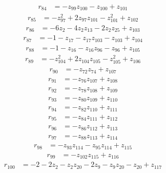 \begin{align*}
r_{84} &= -z_{99}z_{100} - z_{100} + z_{101}
\end{align*}
\begin{align*}
r_{85} &= -z_{97}^{2} + 2z_{97}z_{101} - z_{101}^{2} + z_{102}
\end{align*}
\begin{align*}
r_{86} &= -6z_{2} - 4z_{2}z_{13} - 2z_{2}z_{25} + z_{103}
\end{align*}
\begin{align*}
r_{87} &= -1 - z_{17} - z_{17}z_{103} - z_{103} + z_{104}
\end{align*}
\begin{align*}
r_{88} &= -1 - z_{16} - z_{16}z_{96} - z_{96} + z_{105}
\end{align*}
\begin{align*}
r_{89} &= -z_{104}^{2} + 2z_{104}z_{105} - z_{105}^{2} + z_{106}
\end{align*}
\begin{align*}
r_{90} &= -z_{72}z_{74} + z_{107}
\end{align*}
\begin{align*}
r_{91} &= -z_{76}z_{107} + z_{108}
\end{align*}
\begin{align*}
r_{92} &= -z_{78}z_{108} + z_{109}
\end{align*}
\begin{align*}
r_{93} &= -z_{80}z_{109} + z_{110}
\end{align*}
\begin{align*}
r_{94} &= -z_{82}z_{110} + z_{111}
\end{align*}
\begin{align*}
r_{95} &= -z_{84}z_{111} + z_{112}
\end{align*}
\begin{align*}
r_{96} &= -z_{86}z_{112} + z_{113}
\end{align*}
\begin{align*}
r_{97} &= -z_{88}z_{113} + z_{114}
\end{align*}
\begin{align*}
r_{98} &= -z_{93}z_{114} - z_{95}z_{114} + z_{115}
\end{align*}
\begin{align*}
r_{99} &= -z_{102}z_{115} + z_{116}
\end{align*}
\begin{align*}
r_{100} &= -2 - 2z_{2} - z_{2}z_{20} - 2z_{9} - z_{9}z_{20} - z_{20} + z_{117}
\end{align*}
